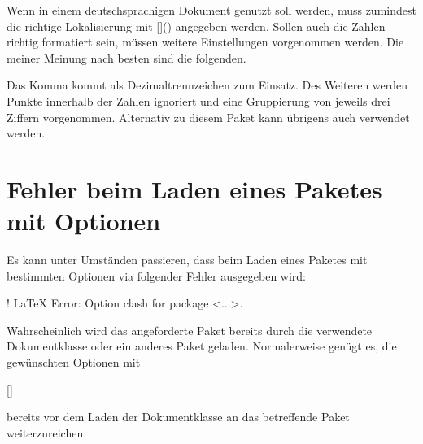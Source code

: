 Wenn  in einem deutschsprachigen Dokument genutzt soll
werden, muss zumindest die richtige Lokalisierung mit
[]() angegeben werden. 
Sollen auch die Zahlen richtig formatiert sein, müssen weitere Einstellungen 
vorgenommen werden. Die meiner Meinung nach besten sind die folgenden.
%
\begin{quoting}
\begin{Code}
\end{Code}
\end{quoting}
%
Das Komma kommt als Dezimaltrennzeichen zum Einsatz. Des Weiteren werden Punkte 
innerhalb der Zahlen ignoriert und eine Gruppierung von jeweils drei Ziffern 
vorgenommen. Alternativ zu diesem Paket kann übrigens auch  
verwendet werden.



\section{%
  Fehler beim Laden eines Paketes mit Optionen%
  \label{sec:tips:options}%
}

%
Es kann unter Umständen passieren, dass beim Laden eines Paketes mit bestimmten 
Optionen via  folgender Fehler ausgegeben wird:
%
\begin{quoting}
\begin{Code}
! LaTeX Error: Option clash for package <...>.
\end{Code}
\end{quoting}
%
Wahrscheinlich wird das angeforderte Paket bereits durch die verwendete 
Dokumentklasse oder ein anderes Paket geladen. Normalerweise genügt es, die 
gewünschten Optionen mit
\begin{quoting}
\begin{Entity}{}
\newline%
[]%
\end{Entity}
\end{quoting}
bereits vor dem Laden der Dokumentklasse an das betreffende Paket 
weiterzureichen.



